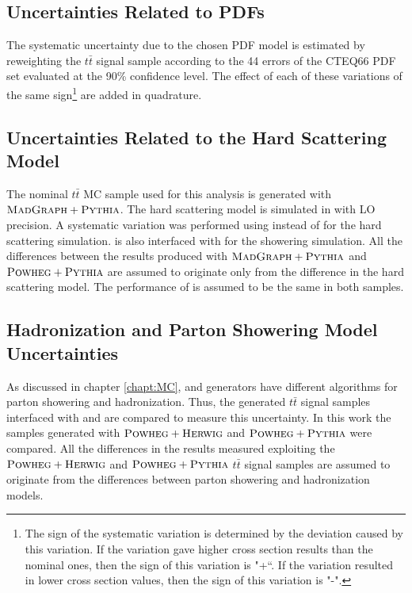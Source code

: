 \subsection{Uncertainties Related to PDFs}

The systematic uncertainty due to the chosen PDF model is estimated by reweighting the $t\bar{t}$ signal sample according to the 
44 errors of the CTEQ66 PDF set evaluated at the 90\% confidence level\cite{Lai:2010vv}. The effect of each of these variations
of the same sign\footnote{The sign of the systematic variation is determined by the deviation caused by this
variation. If the variation gave higher cross section results than the nominal ones, then the sign of this variation is "+``. 
If the variation resulted in lower cross section values, then the sign of this variation is "-".} are added in quadrature.


\subsection{Uncertainties Related to the Hard Scattering Model}

The nominal $t\bar{t}$ MC sample used for this analysis is generated with $\textsc{MadGraph}+\textsc{Pythia}$. The hard scattering model is simulated
in \MG with LO precision. A systematic variation was performed using \Powheg instead of \MG for the hard scattering simulation.
\Powheg is also interfaced with \PYTHIA for the showering simulation. All the differences between the results produced with $\textsc{MadGraph}+\textsc{Pythia}$
and $\textsc{Powheg}+\textsc{Pythia}$ are assumed to originate only from the difference in the hard scattering model. The performance of \PYTHIA is assumed 
to be the same in both samples.

\subsection{Hadronization and Parton Showering Model Uncertainties}

As discussed in chapter \ref{chapt:MC}, \PYTHIA and \HERWIG generators have different algorithms for parton showering and hadronization.
Thus, the generated $t\bar{t}$ signal samples interfaced with \PYTHIA and \HERWIG are compared to measure this uncertainty. In this work
the samples generated with $\textsc{Powheg}+\textsc{Herwig}$ and $\textsc{Powheg}+\textsc{Pythia}$ were compared. All the differences in the results measured exploiting the
$\textsc{Powheg}+\textsc{Herwig}$ and $\textsc{Powheg}+\textsc{Pythia}$ $t\bar{t}$ signal samples are assumed to originate from the differences between parton showering
and hadronization models.

